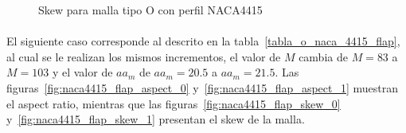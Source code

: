 \documentclass[letterpaper, openright, 12pt]{book}
\begin{document}
\begin{figure}[H]

        \caption[Skew para malla tipo O con perfil NACA4415]{Skew para malla
          tipo O con perfil NACA4415}
        \label{fig:naca4415_skew_1}
    \end{figure}

    \paragraph*{}
    El siguiente caso corresponde al descrito en la
    tabla~\ref{tabla_o_naca_4415_flap}, al cual se le realizan los mismos
    incrementos, el valor de $M$ cambia de $M=83$ a $M=103$ y el valor de
    $aa_m$ de $aa_m = 20.5$ a $aa_m = 21.5$. Las
    figuras~\ref{fig:naca4415_flap_aspect_0} y~\ref{fig:naca4415_flap_aspect_1}
    muestran el aspect ratio, mientras que las
    figuras~\ref{fig:naca4415_flap_skew_0} y~\ref{fig:naca4415_flap_skew_1}
    presentan el skew de la malla.
\end{document}

